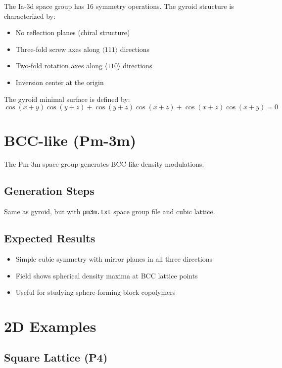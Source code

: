 The Ia-3d space group has 16 symmetry operations. The gyroid structure is characterized by:
\begin{itemize}
    \item No reflection planes (chiral structure)
    \item Three-fold screw axes along $\langle 111 \rangle$ directions
    \item Two-fold rotation axes along $\langle 110 \rangle$ directions
    \item Inversion center at the origin
\end{itemize}

The gyroid minimal surface is defined by:
\begin{equation}
    \cos(x+y)\cos(y+z) + \cos(y+z)\cos(x+z) + \cos(x+z)\cos(x+y) = 0
\end{equation}

\section{BCC-like (Pm-3m)}

The Pm-3m space group generates BCC-like density modulations.

\subsection{Generation Steps}

Same as gyroid, but with \texttt{pm3m.txt} space group file and cubic lattice.

\subsection{Expected Results}

\begin{itemize}
    \item Simple cubic symmetry with mirror planes in all three directions
    \item Field shows spherical density maxima at BCC lattice points
    \item Useful for studying sphere-forming block copolymers
\end{itemize}

\section{2D Examples}

\subsection{Square Lattice (P4)}

